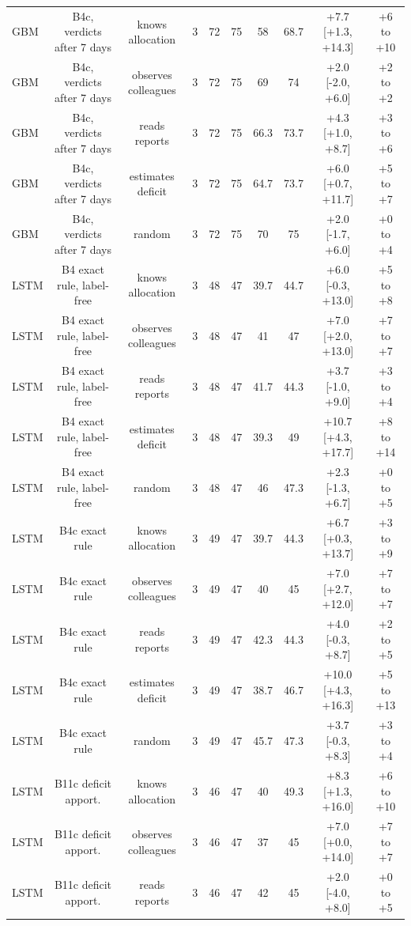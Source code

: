 \documentclass[10pt,onecolumn,letterpaper]{article}
\begin{document}
\begin{table}[!t]
{\begin{tabular}{lccccccccc}
GBM & B4c, verdicts after 7 days & knows allocation & 3 & 72 & 75 & 58 & 68.7 & +7.7 [+1.3, +14.3] & +6 to +10 \\
GBM & B4c, verdicts after 7 days & observes colleagues & 3 & 72 & 75 & 69 & 74 & +2.0 [-2.0, +6.0] & +2 to +2 \\
GBM & B4c, verdicts after 7 days & reads reports & 3 & 72 & 75 & 66.3 & 73.7 & +4.3 [+1.0, +8.7] & +3 to +6 \\
GBM & B4c, verdicts after 7 days & estimates deficit & 3 & 72 & 75 & 64.7 & 73.7 & +6.0 [+0.7, +11.7] & +5 to +7 \\
GBM & B4c, verdicts after 7 days & random & 3 & 72 & 75 & 70 & 75 & +2.0 [-1.7, +6.0] & +0 to +4 \\
LSTM & B4 exact rule, label-free & knows allocation & 3 & 48 & 47 & 39.7 & 44.7 & +6.0 [-0.3, +13.0] & +5 to +8 \\
LSTM & B4 exact rule, label-free & observes colleagues & 3 & 48 & 47 & 41 & 47 & +7.0 [+2.0, +13.0] & +7 to +7 \\
LSTM & B4 exact rule, label-free & reads reports & 3 & 48 & 47 & 41.7 & 44.3 & +3.7 [-1.0, +9.0] & +3 to +4 \\
LSTM & B4 exact rule, label-free & estimates deficit & 3 & 48 & 47 & 39.3 & 49 & +10.7 [+4.3, +17.7] & +8 to +14 \\
LSTM & B4 exact rule, label-free & random & 3 & 48 & 47 & 46 & 47.3 & +2.3 [-1.3, +6.7] & +0 to +5 \\
LSTM & B4c exact rule & knows allocation & 3 & 49 & 47 & 39.7 & 44.3 & +6.7 [+0.3, +13.7] & +3 to +9 \\
LSTM & B4c exact rule & observes colleagues & 3 & 49 & 47 & 40 & 45 & +7.0 [+2.7, +12.0] & +7 to +7 \\
LSTM & B4c exact rule & reads reports & 3 & 49 & 47 & 42.3 & 44.3 & +4.0 [-0.3, +8.7] & +2 to +5 \\
LSTM & B4c exact rule & estimates deficit & 3 & 49 & 47 & 38.7 & 46.7 & +10.0 [+4.3, +16.3] & +5 to +13 \\
LSTM & B4c exact rule & random & 3 & 49 & 47 & 45.7 & 47.3 & +3.7 [-0.3, +8.3] & +3 to +4 \\
LSTM & B11c deficit apport. & knows allocation & 3 & 46 & 47 & 40 & 49.3 & +8.3 [+1.3, +16.0] & +6 to +10 \\
LSTM & B11c deficit apport. & observes colleagues & 3 & 46 & 47 & 37 & 45 & +7.0 [+0.0, +14.0] & +7 to +7 \\
LSTM & B11c deficit apport. & reads reports & 3 & 46 & 47 & 42 & 45 & +2.0 [-4.0, +8.0] & +0 to +5 \\

\end{tabular}}
\end{table}
\end{document}
